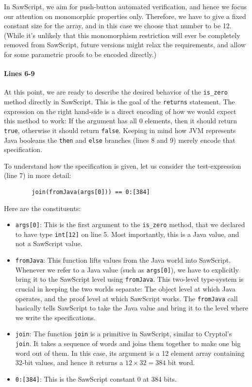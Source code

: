 \documentclass[12pt]{galois-whitepaper}
\newcommand{\sawScript}{{\sc SawScript}\xspace}
\begin{document}
In \sawScript, we
aim for push-button automated verification, and hence we focus our attention on monomorphic properties only. Therefore, we have to give
a fixed constant size for the array, and in this case we choose that number to be 12. (While it's unlikely that this monomorphism restriction
will ever be completely removed from \sawScript, future versions might relax the requirements, and allow for some parametric proofs to be encoded directly.)

\paragraph{Lines 6-9} At this point, we are ready to describe the desired behavior of the {\tt is\_zero} method directly in \sawScript. This is the goal
of the {\tt returns} statement. The expression on the right hand-side is a direct encoding of how we would expect this method to work: If the argument
has all 0 elements, then it should return {\tt true}, otherwise it should return {\tt false}. Keeping in mind how JVM represents Java booleans
the {\tt then} and {\tt else} branches (lines 8 and 9) merely encode that specification.

To understand how the specification is given, let us consider the test-expression (line 7) in more detail:

\begin{verbatim}
        join(fromJava(args[0])) == 0:[384]
\end{verbatim}

Here are the constituents:
\begin{itemize}
\item {\tt args[0]}: This is the first argument to the {\tt is\_zero} method, that we declared to have type {\tt int[12]} on line 5. Most importantly,
this is a Java value, and not a \sawScript value.
\item {\tt fromJava}: This function lifts values from the Java world into \sawScript. 
Whenever we refer to a Java value (such as {\tt args[0]}), we have to
explicitly bring it to the \sawScript level using {\tt fromJava}. This two-level type-system is crucial in keeping the two worlds separate: The object level at which
Java operates, and the proof level at which \sawScript works. The {\tt fromJava} call basically tells \sawScript to take the Java value and bring it to the
level where we write the specifications.
\item {\tt join}: The function {\tt join} is a primitive in \sawScript, similar to Cryptol's {\tt join}. It takes a sequence of words and joins them
together to make one big word out of them. In this case, its argument is a 12 element array containing 32-bit values, and hence it returns a $12\times32 = 384$
bit word.
\item {\tt 0:[384]}: This is the \sawScript constant 0 at 384 bits.
\end{itemize}
\end{document}
